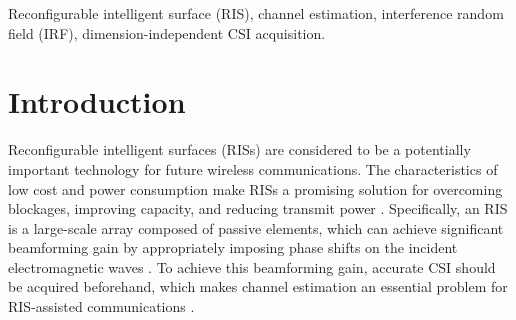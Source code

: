 \documentclass[conference,10pt,twocolumn]{IEEEtran}
\theoremstyle{nonumberplain}
\begin{document}
\begin{abstract}
Reconfigurable intelligent surfaces (RISs) are envisioned as a potentially transformative technology for future wireless communications.
However, RIS's inability to process signals and their attendant increased channel dimension have brought new challenges to RIS-assisted systems, which greatly increases the pilot overhead required for channel estimation.
In this paper, we propose a dimension-independent channel state information (CSI) acquisition approach in which the required pilot overhead is independent of the number of RIS elements.
In order to achieve this dimension-independent property, we propose a novel signaling method in which signals are transmitted from the base station (BS) and the user simultaneously during CSI acquisition.
Under this method, an electromagnetic interference random field (IRF) will be induced on the RIS, and we employ a sensing RIS to capture its features.
Moreover, we develop three algorithms for parameter estimation in this system, and also derive the Cram{\'e}r-Rao lower bound (CRLB) and an asymptotic expression for it. 
Simulation results verify that our proposed signal transmission method and the corresponding algorithms can achieve dimension-independent CSI acquisition for beamforming.
\end{abstract}

\begin{IEEEkeywords}
Reconfigurable intelligent surface (RIS), channel estimation, interference random field (IRF), dimension-independent CSI acquisition. 
\end{IEEEkeywords}

\section{Introduction}
Reconfigurable intelligent surfaces (RISs) are considered to be a potentially important technology for future wireless communications.
The characteristics of low cost and power consumption make RISs a promising solution for overcoming blockages, improving capacity, and reducing transmit power \cite{basar2019wireless,liu2021compact,wu2019intelligent}.
Specifically, an RIS is a large-scale array composed of passive elements, which can achieve significant beamforming gain by appropriately imposing phase shifts on the incident electromagnetic waves \cite{di2020smart}.
To achieve this beamforming gain, accurate \ac{CSI} should be acquired beforehand, which makes channel estimation an essential problem for RIS-assisted communications \cite{wei2021channel}.
\end{document}
